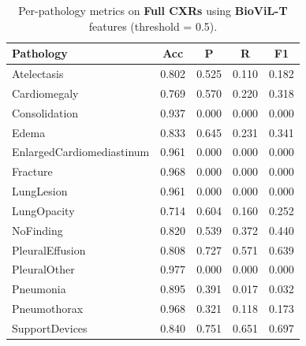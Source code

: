 \begin{table}[H]
\centering
\small
\begin{tabular}{lcccc}
\toprule
\textbf{Pathology} & \textbf{Acc} & \textbf{P} & \textbf{R} & \textbf{F1} \\
\midrule
Atelectasis               & 0.802 & 0.525 & 0.110 & 0.182 \\
Cardiomegaly              & 0.769 & 0.570 & 0.220 & 0.318 \\
Consolidation             & 0.937 & 0.000 & 0.000 & 0.000 \\
Edema                     & 0.833 & 0.645 & 0.231 & 0.341 \\
EnlargedCardiomediastinum & 0.961 & 0.000 & 0.000 & 0.000 \\
Fracture                  & 0.968 & 0.000 & 0.000 & 0.000 \\
LungLesion                & 0.961 & 0.000 & 0.000 & 0.000 \\
LungOpacity               & 0.714 & 0.604 & 0.160 & 0.252 \\
NoFinding                 & 0.820 & 0.539 & 0.372 & 0.440 \\
PleuralEffusion           & 0.808 & 0.727 & 0.571 & 0.639 \\
PleuralOther              & 0.977 & 0.000 & 0.000 & 0.000 \\
Pneumonia                 & 0.895 & 0.391 & 0.017 & 0.032 \\
Pneumothorax              & 0.968 & 0.321 & 0.118 & 0.173 \\
SupportDevices            & 0.840 & 0.751 & 0.651 & 0.697 \\
\bottomrule
\end{tabular}
\caption{Per-pathology metrics on \textbf{Full CXRs} using \textbf{BioViL-T} features (threshold = 0.5).}
\label{tab:full_biovil}
\end{table}

